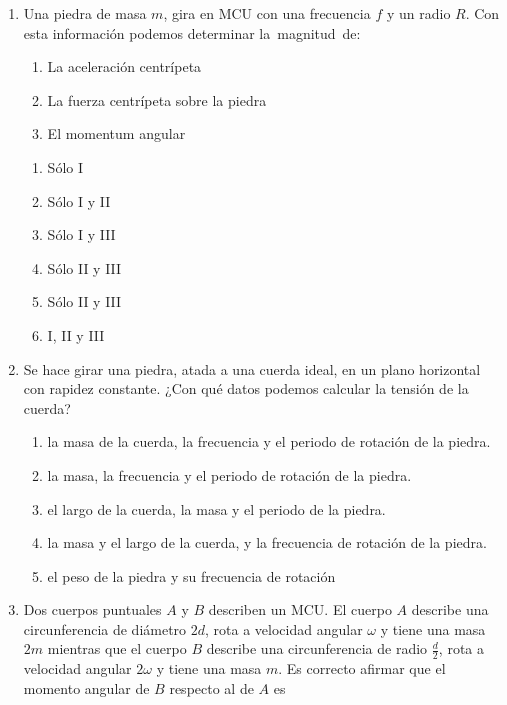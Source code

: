 \documentclass[letterpaper]{article}
\begin{document}
\begin{enumerate}

\item Una piedra de masa $m$, gira en MCU con una frecuencia $f$ y un radio $R$. Con esta información podemos determinar la magnitud de:

\begin{enumerate}[label=\Roman*)]
\item La aceleración centrípeta
\item La fuerza centrípeta sobre la piedra
\item El momentum angular
\end{enumerate}

\begin{enumerate}[label=\Alph*)]
\item Sólo I
\item Sólo I y II
\item Sólo I y III
\item Sólo II y III
\item Sólo II y III
\item I, II y III
\end{enumerate}

\item Se hace girar una piedra, atada a una cuerda ideal, en un plano horizontal con rapidez constante. ¿Con qué datos podemos calcular la tensión de la cuerda?

\begin{enumerate}[label=\Alph*)]
\item la masa de la cuerda, la frecuencia y el periodo de rotación de la piedra. 
\item la masa, la frecuencia y el periodo de rotación de la piedra.
\item el largo de la cuerda, la masa y el periodo de la piedra.
\item la masa y el largo de la cuerda, y la frecuencia de rotación de la piedra.
\item el peso de la piedra y su frecuencia de rotación
\end{enumerate}

\item Dos cuerpos puntuales $A$ y $B$ describen un MCU. El cuerpo $A$ describe una circunferencia de diámetro $2d$, rota a velocidad angular $\omega$ y tiene una masa $2m$ mientras que el cuerpo $B$ describe una circunferencia de radio $\frac{d}{2}$, rota a velocidad angular $2\omega$ y tiene una masa $m$. Es correcto afirmar que el momento angular de $B$ respecto al de $A$ es


\end{enumerate}
\end{document}
